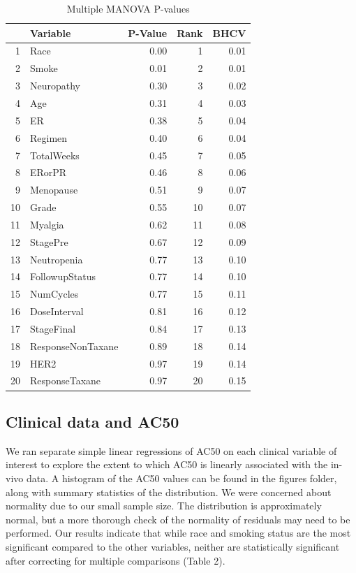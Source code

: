 \documentclass[12pt]{article}
\begin{document}
\begin{table}[ht]
\caption{Multiple MANOVA P-values}
\centering
\begin{tabular}{rlrrr}
  \hline
 & Variable & P-Value & Rank & BHCV \\ 
  \hline
1 & Race & 0.00 &   1 & 0.01 \\ 
  2 & Smoke & 0.01 &   2 & 0.01 \\ 
  3 & Neuropathy & 0.30 &   3 & 0.02 \\ 
  4 & Age & 0.31 &   4 & 0.03 \\ 
  5 & ER & 0.38 &   5 & 0.04 \\ 
  6 & Regimen & 0.40 &   6 & 0.04 \\ 
  7 & TotalWeeks & 0.45 &   7 & 0.05 \\ 
  8 & ERorPR & 0.46 &   8 & 0.06 \\ 
  9 & Menopause & 0.51 &   9 & 0.07 \\ 
  10 & Grade & 0.55 &  10 & 0.07 \\ 
  11 & Myalgia & 0.62 &  11 & 0.08 \\ 
  12 & StagePre & 0.67 &  12 & 0.09 \\ 
  13 & Neutropenia & 0.77 &  13 & 0.10 \\ 
  14 & FollowupStatus & 0.77 &  14 & 0.10 \\ 
  15 & NumCycles & 0.77 &  15 & 0.11 \\ 
  16 & DoseInterval & 0.81 &  16 & 0.12 \\ 
  17 & StageFinal & 0.84 &  17 & 0.13 \\ 
  18 & ResponseNonTaxane & 0.89 &  18 & 0.14 \\ 
  19 & HER2 & 0.97 &  19 & 0.14 \\ 
  20 & ResponseTaxane & 0.97 &  20 & 0.15 \\ 
   \hline
\end{tabular}
\end{table}

\subsection{Clinical data and AC50}

We ran separate simple linear regressions of AC50 on each clinical variable of interest to explore the extent to which AC50 is linearly associated with the in-vivo data. A histogram of the AC50 values can be found in the figures folder, along with summary statistics of the distribution.  We were concerned about normality due to our small sample size.  The distribution is approximately normal, but a more thorough check of the normality of residuals may need to be performed.  Our results indicate that while race and smoking status are the most significant compared to the other variables, neither are statistically significant after correcting for multiple comparisons (Table 2). \\
\end{document}
